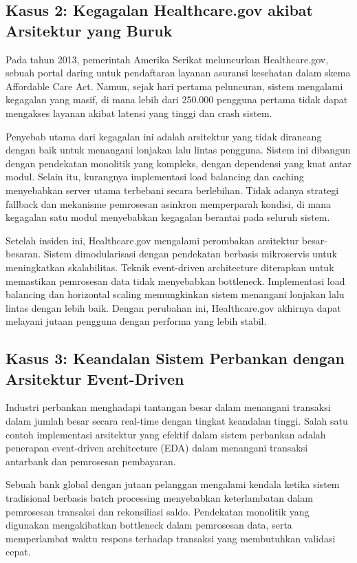 \subsection{Kasus 2: Kegagalan Healthcare.gov akibat Arsitektur yang Buruk}

Pada tahun 2013, pemerintah Amerika Serikat meluncurkan Healthcare.gov, sebuah portal daring untuk pendaftaran layanan asuransi kesehatan dalam skema Affordable Care Act. Namun, sejak hari pertama peluncuran, sistem mengalami kegagalan yang masif, di mana lebih dari 250.000 pengguna pertama tidak dapat mengakses layanan akibat latensi yang tinggi dan crash sistem.

Penyebab utama dari kegagalan ini adalah arsitektur yang tidak dirancang dengan baik untuk menangani lonjakan lalu lintas pengguna. Sistem ini dibangun dengan pendekatan monolitik yang kompleks, dengan dependensi yang kuat antar modul. Selain itu, kurangnya implementasi load balancing dan caching menyebabkan server utama terbebani secara berlebihan. Tidak adanya strategi fallback dan mekanisme pemrosesan asinkron memperparah kondisi, di mana kegagalan satu modul menyebabkan kegagalan berantai pada seluruh sistem.

Setelah insiden ini, Healthcare.gov mengalami perombakan arsitektur besar-besaran. Sistem dimodularisasi dengan pendekatan berbasis mikroservis untuk meningkatkan skalabilitas. Teknik event-driven architecture diterapkan untuk memastikan pemrosesan data tidak menyebabkan bottleneck. Implementasi load balancing dan horizontal scaling memungkinkan sistem menangani lonjakan lalu lintas dengan lebih baik. Dengan perubahan ini, Healthcare.gov akhirnya dapat melayani jutaan pengguna dengan performa yang lebih stabil.

\subsection{Kasus 3: Keandalan Sistem Perbankan dengan Arsitektur Event-Driven}

Industri perbankan menghadapi tantangan besar dalam menangani transaksi dalam jumlah besar secara real-time dengan tingkat keandalan tinggi. Salah satu contoh implementasi arsitektur yang efektif dalam sistem perbankan adalah penerapan event-driven architecture (EDA) dalam menangani transaksi antarbank dan pemrosesan pembayaran.

Sebuah bank global dengan jutaan pelanggan mengalami kendala ketika sistem tradisional berbasis batch processing menyebabkan keterlambatan dalam pemrosesan transaksi dan rekonsiliasi saldo. Pendekatan monolitik yang digunakan mengakibatkan bottleneck dalam pemrosesan data, serta memperlambat waktu respons terhadap transaksi yang membutuhkan validasi cepat.

